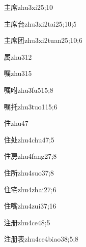 \begin{verbete}{主席}{zhu3xi2}{5;10}
\end{verbete}
\begin{verbete}{主席台}{zhu3xi2tai2}{5;10;5}
\end{verbete}
\begin{verbete}{主席团}{zhu3xi2tuan2}{5;10;6}
\end{verbete}
\begin{verbete}{属}{zhu3}{12}
\end{verbete}
\begin{verbete}{嘱}{zhu3}{15}
\end{verbete}
\begin{verbete}{嘱咐}{zhu3fu5}{15;8}
\end{verbete}
\begin{verbete}{嘱托}{zhu3tuo1}{15;6}
\end{verbete}
\begin{verbete}{住}{zhu4}{7}
\end{verbete}
\begin{verbete}{住处}{zhu4chu4}{7;5}
\end{verbete}
\begin{verbete}{住房}{zhu4fang2}{7;8}
\end{verbete}
\begin{verbete}{住所}{zhu4suo3}{7;8}
\end{verbete}
\begin{verbete}{住宅}{zhu4zhai2}{7;6}
\end{verbete}
\begin{verbete}{住嘴}{zhu4zui3}{7;16}
\end{verbete}
\begin{verbete}{注册}{zhu4ce4}{8;5}
\end{verbete}
\begin{verbete}{注册表}{zhu4ce4biao3}{8;5;8}
\end{verbete}
